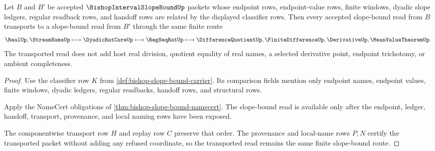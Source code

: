 \begin{theorem}
\label{thm:bishop-slope-bound-classifier-transport}
Let $B$ and $B'$ be accepted $\BishopIntervalSlopeBoundUp$ packets whose endpoint rows, endpoint-value rows, finite windows, dyadic slope ledgers, regular readback rows, and handoff rows are related by the displayed classifier rows. Then every accepted slope-bound read from $B$ transports to a slope-bound read from $B'$ through the same finite route
$$
\RealUp,\StreamNameUp \longmapsto \DyadicRatCoreUp \longmapsto \RegSeqRatUp \longmapsto \DifferenceQuotientUp,\FiniteDifferenceUp,\DerivativeUp,\MeanValueTheoremUp .
$$
The transported read does not add host real division, quotient equality of real names, a selected derivative point, endpoint trichotomy, or ambient completeness.
\end{theorem}
\begin{proof}
Use the classifier row $K$ from \autoref{def:bishop-slope-bound-carrier}. Its comparison fields mention only endpoint names, endpoint values, finite windows, dyadic ledgers, regular readbacks, handoff rows, and structural rows.

Apply the NameCert obligations of \autoref{thm:bishop-slope-bound-namecert}. The slope-bound read is available only after the endpoint, ledger, handoff, transport, provenance, and local naming rows have been exposed.

The componentwise transport row $H$ and replay row $C$ preserve that order. The provenance and local-name rows $P,N$ certify the transported packet without adding any refused coordinate, so the transported read remains the same finite slope-bound route.
\end{proof}

